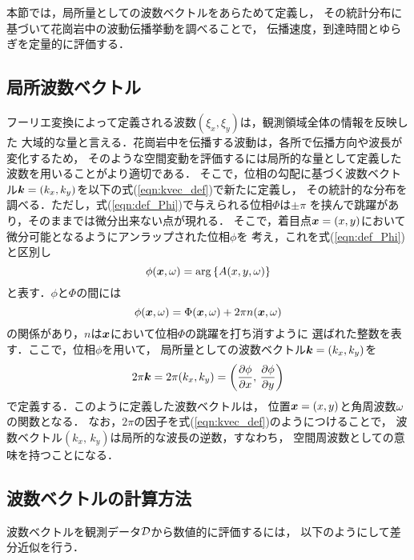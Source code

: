 ﻿本節では，局所量としての波数ベクトルをあらためて定義し，
その統計分布に基づいて花崗岩中の波動伝播挙動を調べることで，
伝播速度，到達時間とゆらぎを定量的に評価する．
\subsection{局所波数ベクトル}
フーリエ変換によって定義される波数$(\xi_x,\xi_y)$は，観測領域全体の情報を反映した
大域的な量と言える．花崗岩中を伝播する波動は，各所で伝播方向や波長が変化するため，
そのような空間変動を評価するには局所的な量として定義した波数を用いることがより適切である．
そこで，位相の勾配に基づく波数ベクトル$\mbox{\boldmath{$k$}}=(k_x,k_y)$を以下の式(\ref{eqn:kvec_def})で新たに定義し，
その統計的な分布を調べる．ただし，式(\ref{eqn:def_Phi})で与えられる位相$\Phi$は$\pm \pi$
を挟んで跳躍があり，そのままでは微分出来ない点が現れる．
そこで，着目点$\mbox{\boldmath{$x$}}=(x,y)$において微分可能となるようにアンラップされた位相$\phi$を
考え，これを式(\ref{eqn:def_Phi})と区別し
\begin{equation}
	\phi(\fat{x},\omega)=\arg\left\{  A(x,y,\omega) \right\}
	\label{eqn:def_phi}
\end{equation}
と表す．$\phi$と$\Phi$の間には
\begin{equation}
	\phi(\fat{x},\omega)=\Phi(\fat{x},\omega) + 2\pi n(\fat{x},\omega )
	\label{eqn:unwrap}
\end{equation}
の関係があり，$n$は$\mbox{\boldmath{$x$}}$において位相$\Phi$の跳躍を打ち消すように
選ばれた整数を表す．ここで，位相$\phi$を用いて，
局所量としての波数ベクトル$\mbox{\boldmath{$k$}}=(k_x,k_y)$を
\begin{equation}
	2\pi \fat{k}= 
	2\pi (k_x,k_y)=
	\left(
		\frac{\partial \phi}{\partial x}
		, \, 
		\frac{\partial \phi}{\partial y} 
	\right)
	\label{eqn:kvec_def}
\end{equation}
で定義する．このように定義した波数ベクトルは，
位置$\mbox{\boldmath{$x$}}=(x,y)$と角周波数$\omega$の関数となる．
なお，$2\pi$の因子を式(\ref{eqn:kvec_def})のようにつけることで，
波数ベクトル$(k_x,\,k_y)$は局所的な波長の逆数，すなわち，
空間周波数としての意味を持つことになる．
\subsection{波数ベクトルの計算方法}
波数ベクトルを観測データ$\cal D$から数値的に評価するには，
以下のようにして差分近似を行う．

